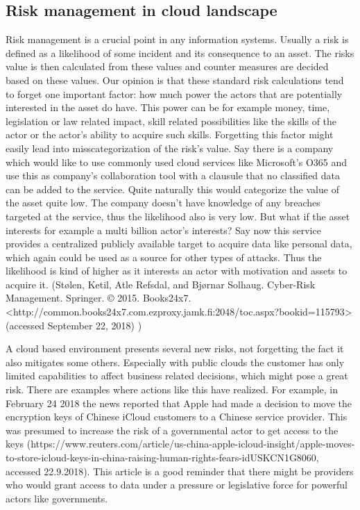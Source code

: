 \documentclass{article}
\begin{document}
\subsection{Risk management in cloud landscape}
Risk management is a crucial point in any information systems. Usually a risk is defined as a likelihood of some incident and its consequence to an asset. The risks value is then calculated from these values and counter measures are decided based on these values. Our opinion is that these standard risk calculations tend to forget one important factor: how much power the actors that are potentially interested in the asset do have. This power can be for example money, time, legislation or law related impact, skill related possibilities like the skills of the actor or the actor's ability to acquire such skills. Forgetting this factor might easily lead into misscategorization of the risk's value. Say there is a company which would like to use commonly used cloud services like Microsoft's O365 and use this as company's collaboration tool with a clausule that no classified data can be added to the service. Quite naturally this would categorize the value of the asset quite low. The company doesn't have knowledge of any breaches targeted at the service, thus the likelihood also is very low. But what if the asset interests for example a multi billion actor's interests? Say now this service provides a centralized publicly available target to acquire data like personal data, which again could be used as a source for other types of attacks. Thus the likelihood is kind of higher as it interests an actor with motivation and assets to acquire it.
(Stølen, Ketil, Atle Refsdal, and Bjørnar Solhaug. Cyber-Risk Management. Springer. © 2015. Books24x7. <http://common.books24x7.com.ezproxy.jamk.fi:2048/toc.aspx?bookid=115793> (accessed September 22, 2018) )
\par
A cloud based environment presents several new risks, not forgetting the fact it also mitigates some others. Especially with public clouds the customer has only limited capabilities to affect business related decisions, which might pose a great risk. There are examples where actions like this have realized. For example, in February 24 2018 the news reported that Apple had made a decision to move the encryption keys of Chinese iCloud customers to a Chinese service provider. This was presumed to increase the risk of a governmental actor to get access to the keys (https://www.reuters.com/article/us-china-apple-icloud-insight/apple-moves-to-store-icloud-keys-in-china-raising-human-rights-fears-idUSKCN1G8060, accessed 22.9.2018). This article is a good reminder that there might be providers who would grant access to data under a pressure or legislative force for powerful actors like governments.
\end{document}
